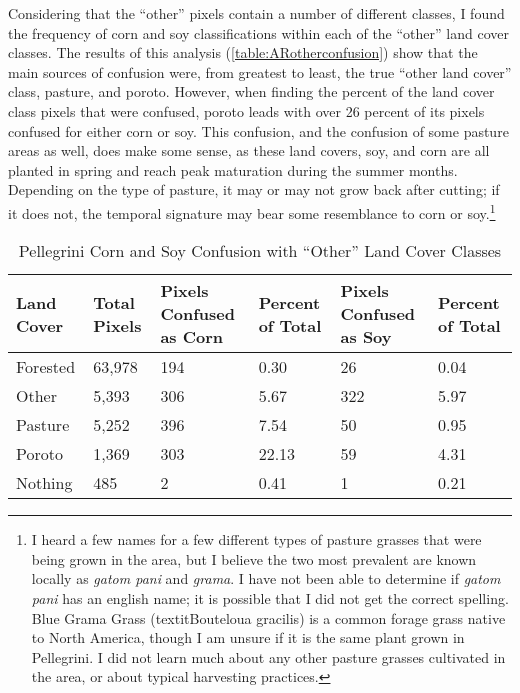 Considering that the ``other'' pixels contain a number of different classes, I found the frequency of corn and soy classifications within each of the ``other'' land cover classes. The results of this analysis (\autoref{table:ARotherconfusion}) show that the main sources of confusion were, from greatest to least, the true ``other land cover'' class, pasture, and poroto. However, when finding the percent of the land cover class pixels that were confused, poroto leads with over 26 percent of its pixels confused for either corn or soy. This confusion, and the confusion of some pasture areas as well, does make some sense, as these land covers, soy, and corn are all planted in spring and reach peak maturation during the summer months. Depending on the type of pasture, it may or may not grow back after cutting; if it does not, the temporal signature may bear some resemblance to corn or soy.\footnote{I heard a few names for a few different types of pasture grasses that were being grown in the area, but I believe the two most prevalent are known locally as \textit{\textspanish{gatom pani}} and \textit{\textspanish{grama}}. I have not been able to determine if \textit{\textspanish{gatom pani}} has an english name; it is possible that I did not get the correct spelling. Blue Grama Grass (textit{Bouteloua gracilis}) is a common forage grass native to North America, though I am unsure if it is the same plant grown in Pellegrini. I did not learn much about any other pasture grasses cultivated in the area, or about typical harvesting practices.}

\begin{table}[b]
  \begin{Spacing}{1.0}
  \centering
  \caption{Pellegrini Corn and Soy Confusion with ``Other'' Land Cover Classes}
  \label{table:ARotherconfusion}
  \begin{tabu}{X[0.6,m,c]X[0.5,m,c]|X[1,m,c]X[0.55,m,c]|X[1,m,c]X[0.55,m,c]}
    \toprule
    \textbf{Land Cover} & \textbf{Total Pixels} & \textbf{Pixels Confused as Corn} & \textbf{Percent of Total} & \textbf{Pixels Confused as Soy} & \textbf{Percent of Total} \\
    \midrule
    Forested & 63,978 & 194 & 0.30 & 26 & 0.04 \\
    Other & 5,393 & 306 & 5.67 & 322 & 5.97 \\
    Pasture & 5,252 & 396 & 7.54 & 50 & 0.95 \\
    Poroto & 1,369 & 303 & 22.13 & 59 & 4.31 \\
    Nothing & 485 & 2 & 0.41 & 1 & 0.21 \\
    \bottomrule
  \end{tabu}
  \end{Spacing}
\end{table}

